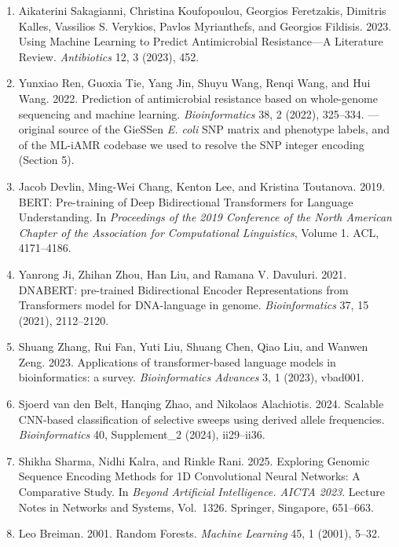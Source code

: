 \documentclass[11pt]{article}
\begin{document}
\begin{enumerate}[leftmargin=2.2em, itemsep=0.4em]
\item Aikaterini Sakagianni, Christina Koufopoulou, Georgios Feretzakis, Dimitris Kalles, Vassilios S. Verykios, Pavlos Myrianthefs, and Georgios Fildisis. 2023. Using Machine Learning to Predict Antimicrobial Resistance---A Literature Review. \textit{Antibiotics} 12, 3 (2023), 452.

\item Yunxiao Ren, Guoxia Tie, Yang Jin, Shuyu Wang, Renqi Wang, and Hui Wang. 2022. Prediction of antimicrobial resistance based on whole-genome sequencing and machine learning. \textit{Bioinformatics} 38, 2 (2022), 325--334. --- original source of the GieSSen \textit{E. coli} SNP matrix and phenotype labels, and of the ML-iAMR codebase we used to resolve the SNP integer encoding (Section 5).

\item Jacob Devlin, Ming-Wei Chang, Kenton Lee, and Kristina Toutanova. 2019. BERT: Pre-training of Deep Bidirectional Transformers for Language Understanding. In \textit{Proceedings of the 2019 Conference of the North American Chapter of the Association for Computational Linguistics}, Volume 1. ACL, 4171--4186.

\item Yanrong Ji, Zhihan Zhou, Han Liu, and Ramana V. Davuluri. 2021. DNABERT: pre-trained Bidirectional Encoder Representations from Transformers model for DNA-language in genome. \textit{Bioinformatics} 37, 15 (2021), 2112--2120.

\item Shuang Zhang, Rui Fan, Yuti Liu, Shuang Chen, Qiao Liu, and Wanwen Zeng. 2023. Applications of transformer-based language models in bioinformatics: a survey. \textit{Bioinformatics Advances} 3, 1 (2023), vbad001.

\item Sjoerd van den Belt, Hanqing Zhao, and Nikolaos Alachiotis. 2024. Scalable CNN-based classification of selective sweeps using derived allele frequencies. \textit{Bioinformatics} 40, Supplement\_2 (2024), ii29--ii36.

\item Shikha Sharma, Nidhi Kalra, and Rinkle Rani. 2025. Exploring Genomic Sequence Encoding Methods for 1D Convolutional Neural Networks: A Comparative Study. In \textit{Beyond Artificial Intelligence. AICTA 2023}. Lecture Notes in Networks and Systems, Vol.\ 1326. Springer, Singapore, 651--663.

\item Leo Breiman. 2001. Random Forests. \textit{Machine Learning} 45, 1 (2001), 5--32.


\end{enumerate}
\end{document}
